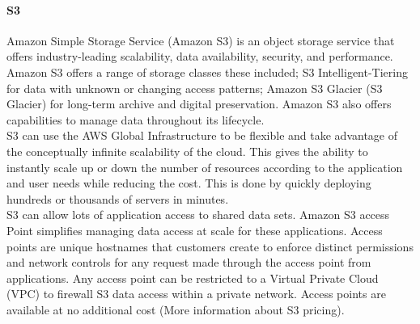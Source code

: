 \documentclass[10pt]{article}
\begin{document}
\paragraph{S3}
Amazon Simple Storage Service (Amazon S3) \cite{S3} is an object storage service that offers industry-leading scalability, data availability, security, and performance. Amazon S3 offers a range of storage classes these included; S3 Intelligent-Tiering for data with unknown or changing access patterns; Amazon S3 Glacier (S3 Glacier) for long-term archive and digital preservation. Amazon S3 also offers capabilities to manage data throughout its lifecycle. \\
S3 can use the AWS Global Infrastructure to be flexible and take advantage of the conceptually infinite scalability of the cloud. This gives the ability to instantly scale up or down the number of resources according to the application and user needs while reducing the cost. This is done by quickly deploying hundreds or thousands of servers in minutes.\\
S3 can allow lots of application access to shared data sets. Amazon S3 access Point simplifies managing data access at scale for these applications. Access points are unique hostnames that customers create to enforce distinct permissions and network controls for any request made through the access point from applications. Any access point can be restricted to a Virtual Private Cloud (VPC) to firewall S3 data access within a private network. Access points are available at no additional cost (More information about S3 pricing\cite{S3-pricing}).\\
\end{document}
